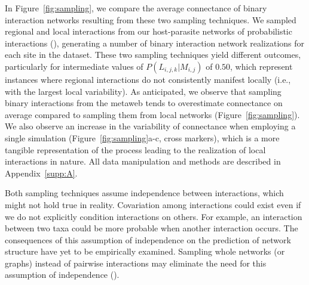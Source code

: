 \begin{box2.5}
In Figure~\ref{fig:sampling}, we compare the average connectance of binary
interaction networks resulting from these two sampling techniques. We sampled
regional and local interactions from our host-parasite networks of probabilistic
interactions (\cite{Kopelke2017Foodweb}), generating a number of binary
interaction network realizations for each site in the dataset. These two
sampling techniques yield different outcomes, particularly for intermediate
values of $P(L_{i, j, k}|M_{i, j})$ of $0.50$, which represent instances where
regional interactions do not consistently manifest locally (i.e., with the
largest local variability). As anticipated, we observe that sampling binary
interactions from the metaweb tends to overestimate connectance on average
compared to sampling them from local networks (Figure~\ref{fig:sampling}). We also
observe an increase in the variability of connectance when employing a single
simulation (Figure~\ref{fig:sampling}a-c, cross markers), which is a more tangible
representation of the process leading to the realization of local interactions
in nature. All data manipulation and methods are described in
Appendix~\ref{supp:A}.

Both sampling techniques assume independence between interactions, which might
not hold true in reality. Covariation among interactions could exist even if we
do not explicitly condition interactions on others. For example, an interaction
between two taxa could be more probable when another interaction occurs. The
consequences of this assumption of independence on the prediction of network
structure have yet to be empirically examined. Sampling whole networks (or
graphs) instead of pairwise interactions may eliminate the need for this
assumption of independence (\cite{Battiston2020Networks}).

\end{box2.5}


